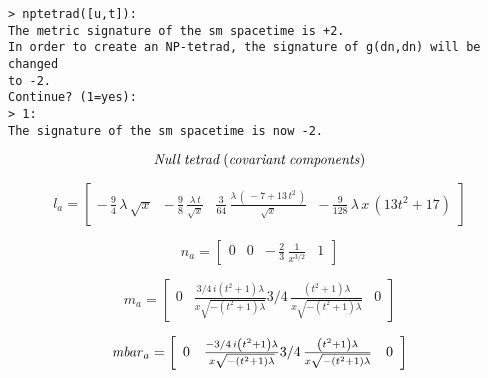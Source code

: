 \documentclass{article}
\begin{document}
{\noindent\texttt{> nptetrad([u,t]):}\\
\indent\texttt{The metric signature of the sm spacetime is +2.}\\
\indent\texttt{In order to create an NP-tetrad, the signature of g(dn,dn)
 will be changed}\\
\indent\texttt{to -2.}\\
\indent\texttt{Continue? (1=yes):}\\
\noindent\texttt{> 1:}\\
\indent\texttt{The signature of the sm spacetime is now -2.\\}

\begin{maplelatex}
\[
{\it Null\:tetrad\:(covariant\:components)}
\]
\end{maplelatex}
\begin{maplelatex}
\[
{{l}_{{a}}}= \left[
{\begin{array}{cccc}
 - \,{\displaystyle \frac {9}{4}}\,{ \lambda}\,\sqrt {{x}} & 
 - \,{\displaystyle \frac {9}{8}}\,{\displaystyle \frac {{ 
\lambda}\,{t}}{\sqrt {{x}}}} & {\displaystyle \frac {3}{64}}\,
{\displaystyle \frac {{ \lambda}\,(\, - 7 + 13\,{t}^{2}\,)}{
\sqrt {{x}}}} &  - \,{\displaystyle \frac {9}{128}}\,{ \lambda}
\,{x}\,(13{t}^{2}+17)
\end{array}}
\right] 
\]
\end{maplelatex}
\begin{maplelatex}
\[
{{n}_{{a}}}= \left[
{\begin{array}{rrcr}
0 & 0 &  - \,{\displaystyle \frac {2}{3}}\,{\displaystyle \frac {
1}{{x}^{3/2}}} & 1
\end{array}}
\right] 
\]
\end{maplelatex}
\begin{maplelatex}
\[
{{m}_{{a}}}= \left[
{\begin{array}{rrcr}
0 &
{\frac {3/4\,i \left( {t}^{2}+1 \right) \lambda}{x\sqrt {- \left( {t}^
{2}+1 \right) \lambda}}}
3/4\,{\frac { \left( {t}^{2}+1 \right) \lambda}{x\sqrt {- \left( {t}^{
2}+1 \right) \lambda}}} & 0
\end{array}}
\right] 
\]
\end{maplelatex}
\begin{maplelatex}
\[
{{\it mbar}_{{a}}}= \left[
{\begin{array}{rccr}
0 & {\frac {-3/4\,i \left( {t}^{2}+1 \right) \lambda}{x\sqrt {- \left( {t}
^{2}+1 \right) \lambda}}}
3/4\,{\frac { \left( {t}^{2}+1 \right) \lambda}{x\sqrt {- \left( {t}^{
2}+1 \right) \lambda}}}
 & 0
\end{array}}
\right] 
\]
\end{maplelatex}

}
\end{document}
